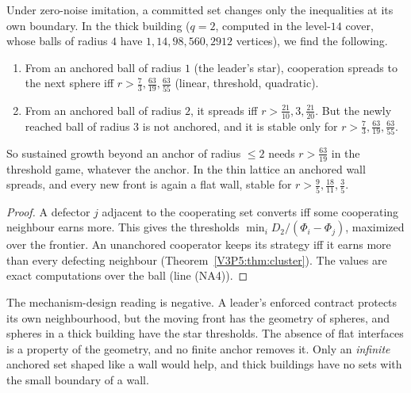 \begin{proposition}\label{V3P5:prop:frontier}
Under zero-noise imitation, a committed set changes only the inequalities at its own boundary.
In the thick building ($q=2$, computed in the level-$14$ cover, whose balls of radius $4$ have
$1,14,98,560,2912$ vertices), we find the following.
\begin{enumerate}
\item[(i)] From an anchored ball of radius $1$ (the leader's star), cooperation spreads to the
next sphere iff $r>\frac73,\frac{63}{19},\frac{63}{55}$ (linear, threshold, quadratic).
\item[(ii)] From an anchored ball of radius $2$, it spreads iff $r>\frac{21}{10},3,\frac{21}{20}$.
But the newly reached ball of radius $3$ is not anchored, and it is stable only for
$r>\frac73,\frac{63}{19},\frac{63}{55}$.
\end{enumerate}
So sustained growth beyond an anchor of radius $\le2$ needs $r>\frac{63}{19}$ in the threshold
game, whatever the anchor. In the thin lattice an anchored wall spreads, and every new front is
again a flat wall, stable for $r>\frac95,\frac{18}{11},\frac35$.
\end{proposition}

\begin{proof}
A defector $j$ adjacent to the cooperating set converts iff some cooperating neighbour earns more.
This gives the thresholds $\min_i D_2/(\Phi_i-\Phi_j)$, maximized over the frontier. An
unanchored cooperator keeps its strategy iff it earns more than every defecting neighbour
(Theorem~\ref{V3P5:thm:cluster}). The values are exact computations over the ball (line (NA4)).
\end{proof}

The mechanism-design reading is negative. A leader's enforced contract protects its own
neighbourhood, but the moving front has the geometry of spheres, and spheres in a thick building
have the star thresholds. The absence of flat interfaces is a property of the geometry, and no
finite anchor removes it. Only an \emph{infinite} anchored set shaped like a wall would help, and
thick buildings have no sets with the small boundary of a wall.


